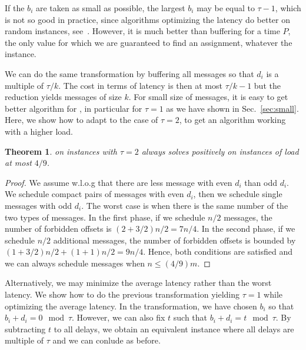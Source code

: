 \documentclass[pdflatex,sn-mathphys,iicol]{sn-jnl}%
\theoremstyle{thmstyleone}%
\newtheorem{theorem}{Theorem}%
\theoremstyle{thmstyletwo}%
\theoremstyle{thmstylethree}%
\begin{document}
If the $b_i$ are taken as small as possible, the largest $b_i$ may be equal to $\tau -1$, which is not so good in practice, since algorithms optimizing the latency do better on random instances, see~\cite{barth2018deterministic}. However, it is much better than buffering for a time $P$, the only value for which we are guaranteed to find an assignment, whatever the instance. 


We can do the same transformation by buffering all messages so that $d_i$ is a multiple of $\tau / k$. The cost in terms of latency is then at most $\tau / k - 1$ but the reduction yields messages of size $k$. For small size of messages, it is easy to get better algorithm for \pma, in particular for $\tau = 1$ as we have shown in Sec.~\ref{sec:small}. Here, we show how to adapt \compactpair to the case of $\tau = 2$, to get an algorithm working with a higher load.


\begin{theorem}
\compactpair on instances with $\tau =2$ always solves \pma positively on instances of load at most $4/9$.
\end{theorem}
\begin{proof}
We assume w.l.o.g that there are less message with even $d_i$ than odd $d_i$.
We schedule compact pairs of messages with even $d_i$, then we schedule single messages with odd $d_i$. The worst case is when there is the same number of the two types of messages. In the first phase, if we schedule $n/2$ messages, the number of forbidden offsets is $(2 + 3/2)n/2 = 7n/4$. In the second phase, if we schedule $n/2$ additional messages, the number of forbidden offsets is bounded by $ (1 + 3/2) n/2  + (1 + 1)n/2 = 9n/4$. Hence, both conditions are satisfied and we can always schedule messages when $n \leq (4/9)m$.
\end{proof}



Alternatively, we may minimize the average latency rather than the worst latency. We show how to do the previous transformation yielding $\tau=1$ while optimizing the average latency.
In the transformation, we have chosen $b_i$ so that $b_i + d_i = 0 \mod \tau$.
However, we can also fix $t$ such that $b_i + d_i = t \mod \tau$.
By subtracting $t$ to all delays, we obtain an equivalent instance where 
all delays are multiple of $\tau$ and we can conlude as before.
\end{document}
